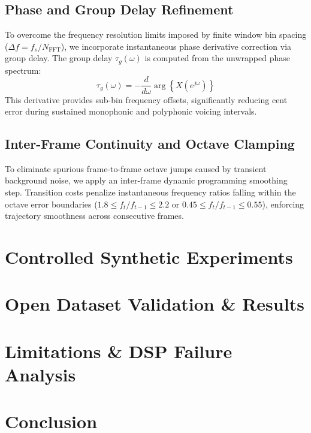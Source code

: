 \documentclass[journal]{IEEEtran}
\begin{document}
\subsection{Phase and Group Delay Refinement}
To overcome the frequency resolution limits imposed by finite window bin spacing ($\Delta f = f_s / N_{\text{FFT}}$), we incorporate instantaneous phase derivative correction via group delay. The group delay $\tau_g(\omega)$ is computed from the unwrapped phase spectrum:
\begin{equation}
\tau_g(\omega)
=
-\frac{d}{d\omega}
\arg\left\{X(e^{j\omega})\right\}
\end{equation}
This derivative provides sub-bin frequency offsets, significantly reducing cent error during sustained monophonic and polyphonic voicing intervals.

\subsection{Inter-Frame Continuity and Octave Clamping}
To eliminate spurious frame-to-frame octave jumps caused by transient background noise, we apply an inter-frame dynamic programming smoothing step. Transition costs penalize instantaneous frequency ratios falling within the octave error boundaries ($1.8 \le f_t / f_{t-1} \le 2.2$ or $0.45 \le f_t / f_{t-1} \le 0.55$), enforcing trajectory smoothness across consecutive frames.

\section{Controlled Synthetic Experiments}
\section{Open Dataset Validation \& Results}
\section{Limitations \& DSP Failure Analysis}
\section{Conclusion}



\end{document}
